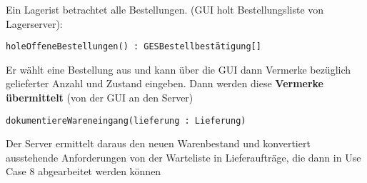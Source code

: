 Ein Lagerist betrachtet alle Bestellungen. (GUI holt Bestellungsliste von Lagerserver):

\texttt{holeOffeneBestellungen() : GESBestellbestätigung[]}

Er wählt eine Bestellung aus und kann über die GUI dann Vermerke bezüglich gelieferter Anzahl und Zustand eingeben. Dann werden diese \textbf{Vermerke übermittelt} (von der GUI an den Server)

\texttt{dokumentiereWareneingang(lieferung : Lieferung)}

Der Server ermittelt daraus den neuen Warenbestand und konvertiert ausstehende Anforderungen von der Warteliste in Lieferaufträge, die dann in Use Case 8 abgearbeitet werden können